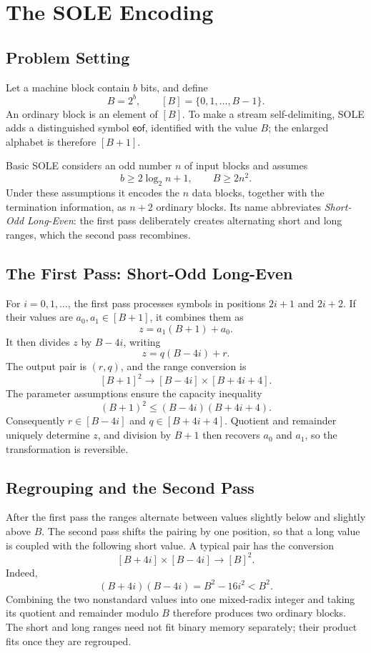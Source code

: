 \section{The SOLE Encoding}
\label{sec:sole}

\subsection{Problem Setting}

Let a machine block contain \(b\) bits, and define
\[
    B=2^b,
    \qquad
    [B]=\{0,1,\ldots,B-1\}.
\]
An ordinary block is an element of \([B]\). To make a stream
self-delimiting, SOLE adds a distinguished symbol \(\mathsf{eof}\), identified
with the value \(B\); the enlarged alphabet is therefore \([B+1]\).

Basic SOLE considers an odd number \(n\) of input blocks and assumes
\[
    b\geq 2\log_2 n+1,
    \qquad
    B\geq 2n^2.
\]
Under these assumptions it encodes the \(n\) data blocks, together with the
termination information, as \(n+2\) ordinary blocks. Its name abbreviates
\emph{Short-Odd Long-Even}: the first pass deliberately creates alternating
short and long ranges, which the second pass recombines.

\subsection{The First Pass: Short-Odd Long-Even}

For \(i=0,1,\ldots\), the first pass processes symbols in positions
\(2i+1\) and \(2i+2\). If their values are \(a_0,a_1\in[B+1]\), it combines
them as
\[
    z=a_1(B+1)+a_0.
\]
It then divides \(z\) by \(B-4i\), writing
\[
    z=q(B-4i)+r.
\]
The output pair is \((r,q)\), and the range conversion is
\[
    [B+1]^2
    \longrightarrow
    [B-4i]\times[B+4i+4].
\]
The parameter assumptions ensure the capacity inequality
\[
    (B+1)^2
    \leq
    (B-4i)(B+4i+4).
\]
Consequently \(r\in[B-4i]\) and \(q\in[B+4i+4]\). Quotient and
remainder uniquely determine \(z\), and division by \(B+1\) then recovers
\(a_0\) and \(a_1\), so the transformation is reversible.

\subsection{Regrouping and the Second Pass}

After the first pass the ranges alternate between values slightly below and
slightly above \(B\). The second pass shifts the pairing by one position, so
that a long value is coupled with the following short value. A typical pair
has the conversion
\[
    [B+4i]\times[B-4i]
    \longrightarrow
    [B]^2.
\]
Indeed,
\[
    (B+4i)(B-4i)=B^2-16i^2<B^2.
\]
Combining the two nonstandard values into one mixed-radix integer and taking
its quotient and remainder modulo \(B\) therefore produces two ordinary
blocks. The short and long ranges need not fit binary memory separately;
their product fits once they are regrouped.

